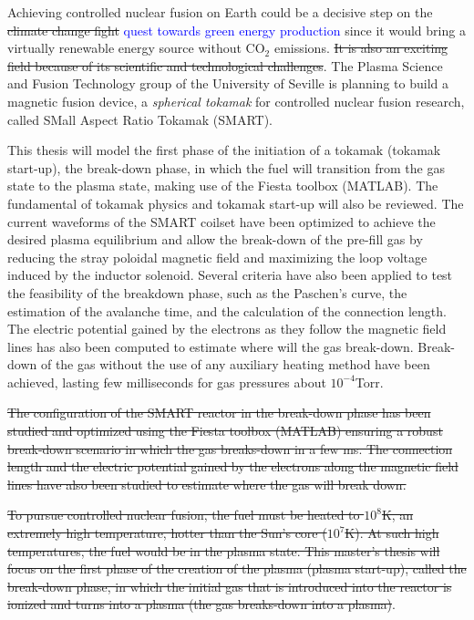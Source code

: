 \documentclass[a4paper,12pt,oneside]{book}
\begin{document}
Achieving controlled nuclear fusion on Earth could be a decisive step on the \st{climate change fight} \textcolor{blue}{quest towards green energy production} since it would bring a virtually renewable energy source without CO$_2$ emissions. \st{It is also an exciting field because of its scientific and technological challenges}. The Plasma Science and Fusion Technology group of the University of Seville is planning to build a magnetic fusion device, a \textit{spherical tokamak} for controlled nuclear fusion research, called SMall Aspect Ratio Tokamak (SMART).

This thesis will model the first phase of the initiation of a tokamak (tokamak start-up), the break-down phase, in which the fuel will transition from the gas state to the plasma state, making use of the Fiesta toolbox (MATLAB). The fundamental of tokamak physics and tokamak start-up will also be reviewed. The current waveforms of the SMART coilset have been optimized to achieve the desired plasma equilibrium and allow the break-down of the pre-fill gas by reducing the stray poloidal magnetic field and maximizing the loop voltage induced by the inductor solenoid. Several criteria have also been applied to test the feasibility of the breakdown phase, such as the Paschen's curve, the estimation of the avalanche time, and the calculation of the connection length. The electric potential gained by the electrons as they follow the magnetic field lines has also been computed to estimate where will the gas break-down. Break-down of the gas without the use of any auxiliary heating method have been achieved, lasting few milliseconds for gas pressures about $10^{-4}$Torr.




\st{The configuration of the SMART reactor in the break-down phase has been studied and optimized using the Fiesta toolbox (MATLAB) ensuring a robust break-down scenario in which the gas breaks-down in a few ms. The connection length and the electric potential gained by the electrons along the magnetic field lines have also been studied to estimate where the gas will break down.}

\st{To pursue controlled nuclear fusion, the fuel must be heated to $10^8$K, an extremely high temperature, hotter than the Sun's core ($10^7$K). At such high temperatures, the fuel would be in the plasma state. This master's thesis will focus on the first phase of the creation of the plasma (plasma start-up), called the break-down phase, in which the initial gas that is introduced into the reactor is ionized and turns into a plasma (the gas breaks-down into a plasma)}.
\end{document}
